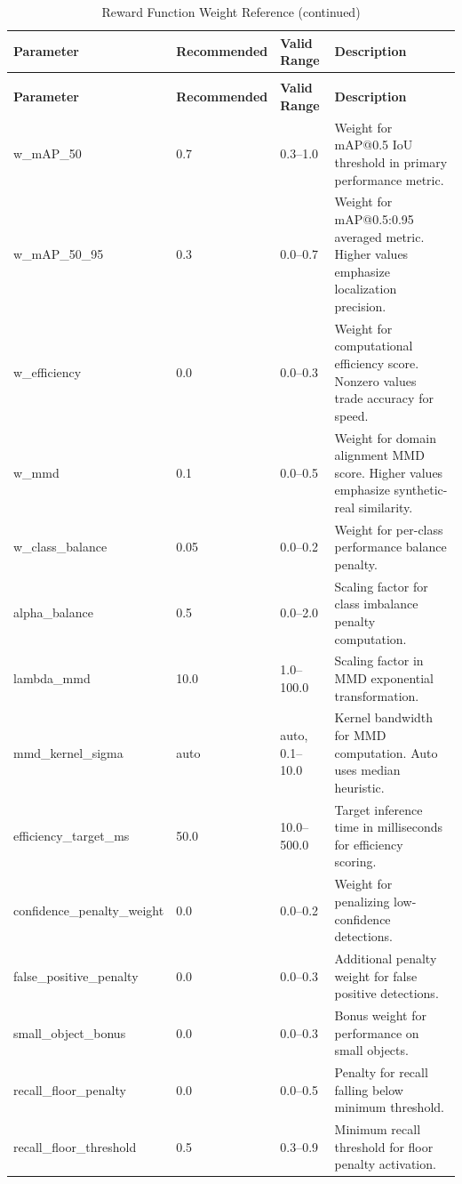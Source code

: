 \begin{longtable}{p{3.5cm}p{2cm}p{2.5cm}p{5.5cm}}
\caption{Reward Function Weight Reference} \label{tab:reward_weights} \\
\toprule
\textbf{Parameter} & \textbf{Recommended} & \textbf{Valid Range} & \textbf{Description} \\
\midrule
\endfirsthead
\caption[]{Reward Function Weight Reference (continued)} \\
\toprule
\textbf{Parameter} & \textbf{Recommended} & \textbf{Valid Range} & \textbf{Description} \\
\midrule
\endhead
\bottomrule
\endfoot
\bottomrule
\endlastfoot
w\_mAP\_50 & 0.7 & 0.3--1.0 & Weight for mAP@0.5 IoU threshold in primary performance metric. \\
\addlinespace
w\_mAP\_50\_95 & 0.3 & 0.0--0.7 & Weight for mAP@0.5:0.95 averaged metric. Higher values emphasize localization precision. \\
\addlinespace
w\_efficiency & 0.0 & 0.0--0.3 & Weight for computational efficiency score. Nonzero values trade accuracy for speed. \\
\addlinespace
w\_mmd & 0.1 & 0.0--0.5 & Weight for domain alignment MMD score. Higher values emphasize synthetic-real similarity. \\
\addlinespace
w\_class\_balance & 0.05 & 0.0--0.2 & Weight for per-class performance balance penalty. \\
\addlinespace
alpha\_balance & 0.5 & 0.0--2.0 & Scaling factor for class imbalance penalty computation. \\
\addlinespace
lambda\_mmd & 10.0 & 1.0--100.0 & Scaling factor in MMD exponential transformation. \\
\addlinespace
mmd\_kernel\_sigma & auto & auto, 0.1--10.0 & Kernel bandwidth for MMD computation. Auto uses median heuristic. \\
\addlinespace
efficiency\_target\_ms & 50.0 & 10.0--500.0 & Target inference time in milliseconds for efficiency scoring. \\
\addlinespace
confidence\_penalty\_weight & 0.0 & 0.0--0.2 & Weight for penalizing low-confidence detections. \\
\addlinespace
false\_positive\_penalty & 0.0 & 0.0--0.3 & Additional penalty weight for false positive detections. \\
\addlinespace
small\_object\_bonus & 0.0 & 0.0--0.3 & Bonus weight for performance on small objects. \\
\addlinespace
recall\_floor\_penalty & 0.0 & 0.0--0.5 & Penalty for recall falling below minimum threshold. \\
\addlinespace
recall\_floor\_threshold & 0.5 & 0.3--0.9 & Minimum recall threshold for floor penalty activation. \\
\end{longtable}

